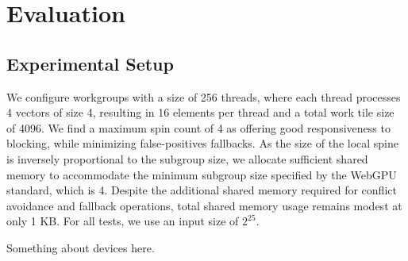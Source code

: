 \documentclass[sigconf]{acmart}
\begin{document}
\section{Evaluation}
\subsection{Experimental Setup}
We configure workgroups with a size of 256 threads, where each thread processes 4 vectors of size 4, resulting in 16 elements per thread and a total work tile size of 4096. We find a maximum spin count of 4 as offering good responsiveness to blocking, while minimizing false-positives fallbacks. As the size of the local spine is inversely proportional to the subgroup size, we allocate sufficient shared memory to accommodate the minimum subgroup size specified by the WebGPU standard, which is 4. Despite the additional shared memory required for conflict avoidance and fallback operations, total shared memory usage remains modest at only 1 KB. For all tests, we use an input size of $2^{25}$.

Something about devices here.
\end{document}
